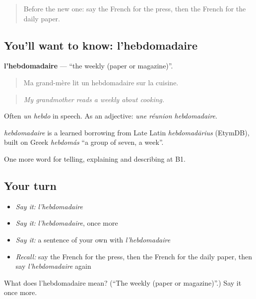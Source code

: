 \begin{quote}
Before the new one: say the French for the press, then the French for the daily paper.
\end{quote}

\subsection*{You'll want to know: l'hebdomadaire}
\textbf{l'hebdomadaire} — \textquotedblleft{}the weekly (paper or magazine)\textquotedblright{}.

\begin{quote}
Ma grand-mère lit un hebdomadaire sur la cuisine.
\end{quote}

\begin{quote}
\emph{My grandmother reads a weekly about cooking.}
\end{quote}

Often \emph{un hebdo} in speech. As an adjective: \emph{une réunion hebdomadaire}.

\begin{cousinweb}
\emph{hebdomadaire} is a learned borrowing from Late Latin \emph{hebdomadārius} (EtymDB), built on Greek \emph{hebdomás} \textquotedblleft{}a group of seven, a week\textquotedblright{}.
\end{cousinweb}

\begin{grammarlens}[title={What you've built}]
One more word for telling, explaining and describing at B1.
\end{grammarlens}

\subsection*{Your turn}
\begin{itemize}
\raggedright
  \item \emph{Say it:} \emph{l'hebdomadaire}
  \item \emph{Say it:} \emph{l'hebdomadaire}, once more
  \item \emph{Say it:} a sentence of your own with \emph{l'hebdomadaire}
  \item \emph{Recall:} say the French for the press, then the French for the daily paper, then say \emph{l'hebdomadaire} again
\end{itemize}

\begin{tcolorbox}[breakable,colback=teal!4,colframe=teal!35!black,title={Before you move on}]
What does l'hebdomadaire mean? (\textquotedblleft{}The weekly (paper or magazine)\textquotedblright{}.) Say it once more.
\end{tcolorbox}
